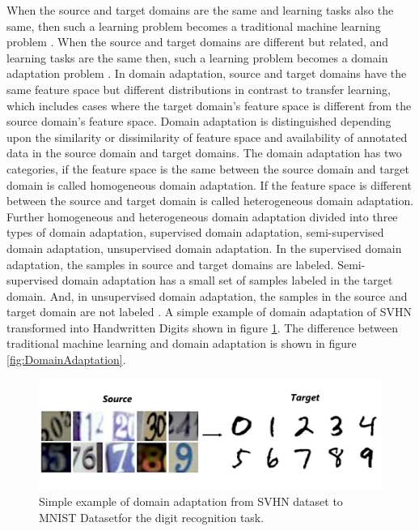 When the source and target domains are the same and learning tasks also the same, then such a learning problem becomes a traditional machine learning problem \cite{5288526}. When the source and target domains are different but related, and learning tasks are the same then, such a learning problem becomes a domain adaptation problem \cite{5288526}. In domain adaptation, source and target domains have the same feature space but different distributions in contrast to transfer learning, which includes cases where the target domain's feature space is different from the source domain's feature space. Domain adaptation is distinguished depending upon the similarity or dissimilarity of feature space and availability of annotated data in the source domain and target domains. The domain adaptation has two categories, if the feature space is the same between the source domain and target domain is called homogeneous domain adaptation. If the feature space is different between the source and target domain is called heterogeneous domain adaptation. Further homogeneous and heterogeneous domain adaptation divided into three types of domain adaptation, supervised domain adaptation, semi-supervised domain adaptation, unsupervised domain adaptation. In the supervised domain adaptation, the samples in source and target domains are labeled. Semi-supervised domain adaptation has a small set of samples labeled in the target domain. And, in unsupervised domain adaptation, the samples in the source and target domain are not labeled \cite{5288526}. A simple example of domain adaptation of  \ac{SVHN} transformed into Handwritten Digits shown in figure \ref{fig:DA}. The difference between traditional machine learning and domain adaptation is shown in figure \ref{fig:DomainAdaptation}.


\begin{figure}[H]
        \begin{center}
 	    \includegraphics[scale=0.15]{images/Introduction/DA.png}
	    \caption[Simple example of domain adaptation from \ac{SVHN} dataset to \ac{MNIST} Dataset for the digit recognition task.]{Simple example of domain adaptation from \ac{SVHN} dataset \cite{37648} to \ac{MNIST} Dataset\footnotemark for the digit recognition task.\footnotemark}
	    \label{fig:DA}
	    \end{center}
\end{figure}





